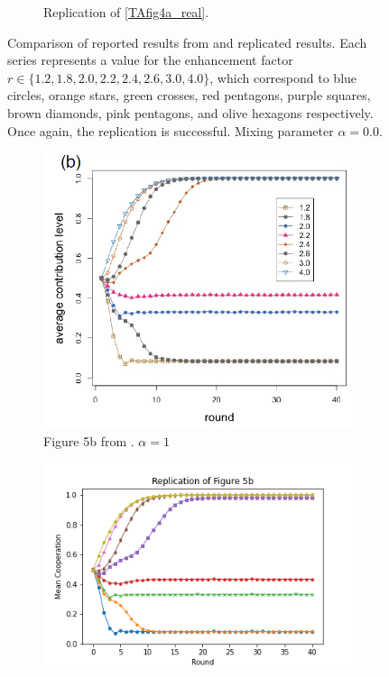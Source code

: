 \begin{figure}[!h]
\begin{subfigure}[b]{0.45\textwidth}
    \caption{Replication of \ref{TAfig4a_real}. }
    \label{TAfig4a}
  \end{subfigure}
  \caption{Comparison of reported results from \cite{RN49} and replicated results. Each series represents a value for the enhancement factor $r \in \{1.2, 1.8, 2.0, 2.2, 2.4, 2.6, 3.0, 4.0\}$, which correspond to blue circles, orange stars, green crosses, red pentagons, purple squares, brown diamonds, pink pentagons, and olive hexagons respectively. Once again, the replication is successful.  Mixing parameter $\alpha = 0.0$. } \label{comp1}
\end{figure} 
\FloatBarrier




\FloatBarrier
\begin{figure}[!h] 
  \begin{subfigure}[b]{0.45\textwidth}
    \includegraphics[width=\textwidth]{images/TAfig4b_real.png}
    \caption{Figure 5b from \cite{RN49}. $\alpha = 1$ }
    \label{TAfig4b_real}
  \end{subfigure}
  \hfill
  \begin{subfigure}[b]{0.45\textwidth}
    \includegraphics[width=1.35\textwidth]{images/TAfig4b.png}

\end{subfigure}
\end{figure}
